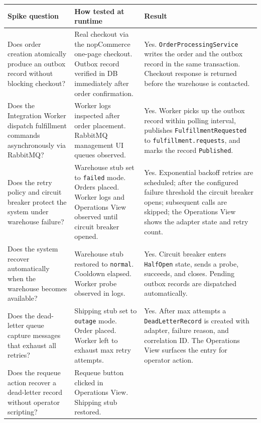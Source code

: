 \begingroup
\small
\setlength{\tabcolsep}{4pt}
\renewcommand{\arraystretch}{1.15}
\begin{center}
\begin{tabular}{|p{}|p{}|p{}|}
\hline
\textbf{Spike question} & \textbf{How tested at runtime} & \textbf{Result} \\
\hline
Does order creation atomically produce an outbox record without blocking checkout? &
Real checkout via the nopCommerce one-page checkout. Outbox record verified in DB
immediately after order confirmation. &
Yes. \texttt{OrderProcessingService} writes the order and the outbox record in the same
transaction. Checkout response is returned before the warehouse is contacted. \\
\hline
Does the Integration Worker dispatch fulfillment commands asynchronously via RabbitMQ? &
Worker logs inspected after order placement. RabbitMQ management UI queues observed. &
Yes. Worker picks up the outbox record within polling interval, publishes
\texttt{FulfillmentRequested} to \texttt{fulfillment.requests}, and marks the record
\texttt{Published}. \\
\hline
Does the retry policy and circuit breaker protect the system under warehouse failure? &
Warehouse stub set to \texttt{failed} mode. Orders placed. Worker logs and Operations View
observed until circuit breaker opened. &
Yes. Exponential backoff retries are scheduled; after the configured failure threshold the
circuit breaker opens; subsequent calls are skipped; the Operations View shows the adapter
state and retry count. \\
\hline
Does the system recover automatically when the warehouse becomes available? &
Warehouse stub restored to \texttt{normal}. Cooldown elapsed. Worker probe observed in logs. &
Yes. Circuit breaker enters \texttt{HalfOpen} state, sends a probe, succeeds, and closes.
Pending outbox records are dispatched automatically. \\
\hline
Does the dead-letter queue capture messages that exhaust all retries? &
Shipping stub set to \texttt{outage} mode. Order placed. Worker left to exhaust max retry
attempts. &
Yes. After max attempts a \texttt{DeadLetterRecord} is created with adapter, failure reason,
and correlation ID. The Operations View surfaces the entry for operator action. \\
\hline
Does the requeue action recover a dead-letter record without operator scripting? &
Requeue button clicked in Operations View. Shipping stub restored. &

\end{tabular}
\end{center}

